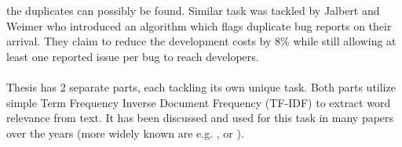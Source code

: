 the duplicates can possibly be found. Similar task was tackled by Jalbert and Weimer \cite{jalbert2008automated} who introduced an algorithm which flags duplicate bug reports on their arrival. They claim to reduce the development costs by 8\% while still allowing at least one reported issue per bug to reach developers.\\
\\
Thesis has 2 separate parts, each tackling its own unique task. Both parts utilize simple Term Frequency Inverse Document Frequency (TF-IDF) to extract word relevance from text. It has been discussed and used for this task in many papers over the years (more widely known are e.g. \cite{ramos2003using}, \cite{lan2005comprehensive} or \cite{gamon2005pulse}).
